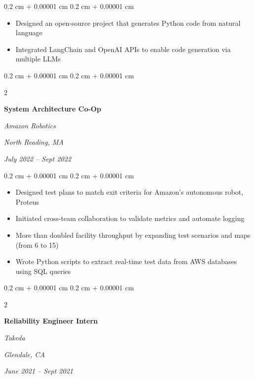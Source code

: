 \documentclass[10pt, letterpaper]{article}
\newenvironment{highlights}{
    \begin{itemize}[
        topsep=0.10 cm,
        parsep=0.10 cm,
        partopsep=0pt,
        itemsep=0pt,
        leftmargin=0.4 cm + 10pt
    ]
}{
    \end{itemize}
} %
\newenvironment{onecolentry}{
    \begin{adjustwidth}{
        0.2 cm + 0.00001 cm
    }{
        0.2 cm + 0.00001 cm
    }
}{
    \end{adjustwidth}
} %
\newenvironment{twocolentry}[2][]{
    \needspace{5\baselineskip}%
    \onecolentry
    \def\secondColumn{#2}
    \setcolumnwidth{\fill, 4.5 cm}
    \begin{paracol}{2}
}{
    \switchcolumn \raggedleft \secondColumn
    \end{paracol}
    \endonecolentry
} %
\begin{document}
        \vspace{0.10 cm}
        \begin{onecolentry}
            \begin{highlights}
                \item Designed an open-source project that generates Python code from natural language
                \item Integrated LangChain and OpenAI APIs to enable code generation via multiple LLMs
            \end{highlights}
        \end{onecolentry}

        \vspace{0.2 cm}

\begin{twocolentry}{
        \textit{North Reading, MA}    
            
        \textit{July 2022 – Sept 2022}}
            \textbf{System Architecture Co-Op}
            
            \textit{Amazon Robotics}
        \end{twocolentry}

        \vspace{0.10 cm}
        \begin{onecolentry}
            \begin{highlights}
                \item Designed test plans to match exit criteria for Amazon’s autonomous robot, Proteus
                \item Initiated cross-team collaboration to validate metrics and automate logging
                \item More than doubled facility throughput by expanding test scenarios and maps (from 6 to 15)
                \item Wrote Python scripts to extract real-time test data from AWS databases using SQL queries
            \end{highlights}
        \end{onecolentry}

        \vspace{0.2 cm}

\begin{twocolentry}{
        \textit{Glendale, CA}    
            
        \textit{June 2021 – Sept 2021}}
            \textbf{Reliability Engineer Intern}
            
            \textit{Takeda}
        \end{twocolentry}
\end{document}
